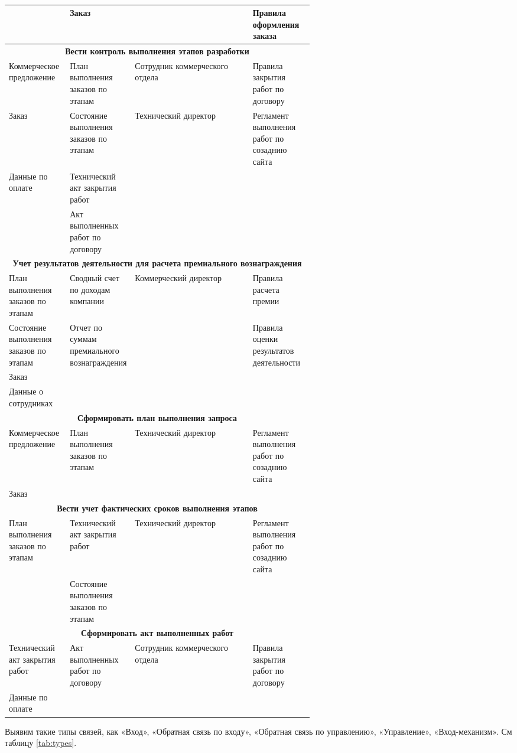 \documentclass[a4paper,14pt]{extarticle}
\begin{document}
\begin{table}[htbp]
\begin{tabular}{|p{0.2\linewidth}|p{0.2\linewidth}|l|p{0.2\linewidth}|}
		& Заказ &  & Правила оформления заказа \\ \hline
		\multicolumn{ 4}{|c|}{\textbf{Вести контроль выполнения этапов разработки}} \\ \hline
		Коммерческое предложение & План выполнения заказов по этапам & Сотрудник коммерческого отдела & Правила закрытия работ по договору \\ \hline
		Заказ & Состояние выполнения заказов по этапам & Технический директор & Регламент выполнения работ по созаднию сайта \\ \hline
		Данные по оплате & Технический акт закрытия работ &  &  \\ \hline
		& Акт выполненных работ по договору &  &  \\ \hline
		\multicolumn{ 4}{|c|}{\textbf{Учет результатов деятельности для расчета премиального вознаграждения}} \\ \hline
		План выполнения заказов по этапам & Сводный счет по доходам компании & Коммерческий директор & Правила расчета премии \\ \hline
		Состояние выполнения заказов по этапам & Отчет по суммам премиального вознаграждения &  & Правила оценки результатов деятельности \\ \hline
		Заказ &  &  &  \\ \hline
		Данные о сотрудниках &  &  &  \\ \hline
		\multicolumn{ 4}{|c|}{\textbf{Сформировать план выполнения запроса}} \\ \hline
		Коммерческое предложение & План выполнения заказов по этапам & Технический директор & Регламент выполнения работ по созаднию сайта \\ \hline
		Заказ &  &  &  \\ \hline
		\multicolumn{ 4}{|c|}{\textbf{Вести учет фактических сроков выполнения этапов}} \\ \hline
		План выполнения заказов по этапам & Технический акт закрытия работ & Технический директор & Регламент выполнения работ по созаднию сайта \\ \hline
		& Состояние выполнения заказов по этапам &  &  \\ \hline
		\multicolumn{ 4}{|c|}{\textbf{Сформировать акт выполненных работ}} \\ \hline
		Технический акт закрытия работ & Акт выполненных работ по договору & Сотрудник коммерческого отдела & Правила закрытия работ по договору \\ \hline
		Данные по оплате &  &  &  \\ \hline
	\end{tabular}
	\caption{}
	\label{tab:io}
\end{table}
\newpage
\problem Выявим такие типы связей, как «Вход», «Обратная связь по входу»,
«Обратная связь по управлению», «Управление», «Вход-механизм». См таблицу \ref{tab:types}.
\end{document}
